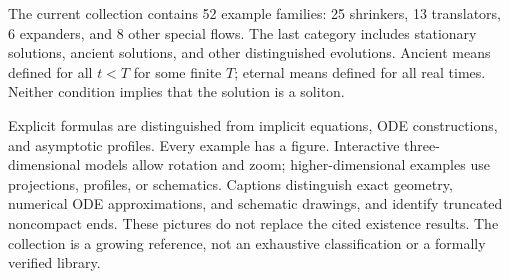 \begin{remark}\label{rem:project-scope}
The current collection contains 52 example families: 25 shrinkers, 13 translators, 6 expanders, and 8 other special flows. The last category includes stationary solutions, ancient solutions, and other distinguished evolutions. Ancient means defined for all $t<T$ for some finite $T$; eternal means defined for all real times. Neither condition implies that the solution is a soliton.

Explicit formulas are distinguished from implicit equations, ODE constructions, and asymptotic profiles. Every example has a figure. Interactive three-dimensional models allow rotation and zoom; higher-dimensional examples use projections, profiles, or schematics. Captions distinguish exact geometry, numerical ODE approximations, and schematic drawings, and identify truncated noncompact ends. These pictures do not replace the cited existence results. The collection is a growing reference, not an exhaustive classification or a formally verified library.
\end{remark}
